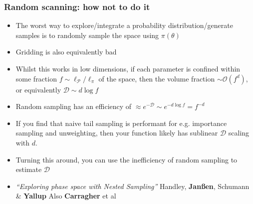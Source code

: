 \documentclass[aspectratio=169]{beamer}
\begin{document}
\begin{frame}
    \frametitle{Random scanning: how not to do it}
    \begin{itemize}
        \item The worst way to explore/integrate a probability distribution/generate samples is to randomly sample the space using $\pi(\theta)$~
        \item Gridding is also equivalently bad
        \item Whilst this works in low dimensions, if each parameter is confined within some fraction $f\sim\ell_\mathcal{P}/\ell_\pi$ of the space, then the volume fraction $\sim\mathcal{O}(f^d)$, or equivalently $\mathcal{D}\sim d\log f$ 
        \item Random sampling has an efficiency of $\boxed{\approx e^{-\mathcal{D}} \sim e^{-d\log f} = f^{-d}}$
        \item If you find that naive tail sampling is performant for e.g. importance sampling and unweighting, then your function likely has sublinear $\mathcal{D}$ scaling with $d$. 
        \item Turning this around, you can use the inefficiency of random sampling to estimate $\mathcal{D}$

        \item \emph{``Exploring phase space with Nested Sampling''} Handley, \textbf{Jan{\ss}en}, Schumann \& \textbf{Yallup} 
            Also \textbf{Carragher} et al~
    \end{itemize}
\end{frame}
\end{document}
